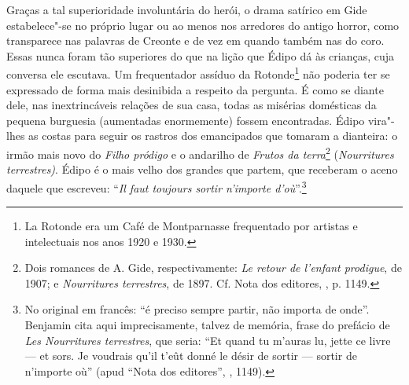 Graças a tal superioridade involuntária do herói, o drama satírico em
Gide estabelece"-se no próprio lugar ou ao menos nos arredores do antigo
horror, como transparece nas palavras de Creonte e de vez em quando
também nas do coro. Essas nunca foram tão superiores do que na lição que
Édipo dá às crianças, cuja conversa ele escutava. Um frequentador
assíduo da Rotonde\footnote{La Rotonde era um Café de Montparnasse
  frequentado por artistas e intelectuais nos anos 1920 e 1930. \versal{[N. E.]}} não
poderia ter se expressado de forma mais desinibida a respeito da
pergunta. É como se diante dele, nas inextrincáveis relações de sua
casa, todas as misérias domésticas da pequena burguesia (aumentadas
enormemente) fossem encontradas. Édipo vira"-lhes as costas para seguir
os rastros dos emancipados que tomaram a dianteira: o irmão mais novo do
\emph{Filho pródigo} e o andarilho de \emph{Frutos da terra}\footnote{Dois romances de A. Gide, respectivamente: \emph{Le retour de l'enfant
  prodigue}, de 1907; e \emph{Nourritures terrestres}, de 1897. Cf. Nota
  dos editores, , p. 1149. \versal{[N. E.]}} (\emph{Nourritures terrestres)}. Édipo é o
mais velho dos grandes que partem, que receberam o aceno daquele que
escreveu: ``\emph{Il faut toujours sortir n'importe d'où}''.\footnote{No original em francês: ``é preciso sempre partir, não importa de onde''.
  Benjamin cita aqui imprecisamente, talvez de memória, frase do
  prefácio de \emph{Les Nourritures terrestres}, que seria: ``Et quand
  tu m'auras lu, jette ce livre --- et sors. Je voudrais qu'il t'eût
  donné le désir de sortir --- sortir de n'importe où'' (apud ``Nota dos
  editores'', , 1149). \versal{[N. T.]}}

